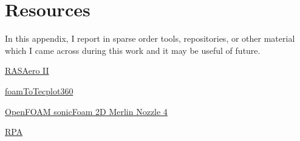 \documentclass[12pt]{article}
\begin{document}
\newpage

\section*{Resources}
In this appendix, I report in sparse order tools, repositories, or other material which I came across during this work and it may be useful of future.

\vspace{0.5cm}

\noindent \href{https://www.rasaero.com/}{RASAero II}

\noindent \href{https://github.com/wyldckat/localFoamToTecplot360}{foamToTecplot360}

\noindent \href{https://github.com/Interfluo/OpenFOAM-sonicFoam-2D-Merlin-Nozzle-4}{OpenFOAM sonicFoam 2D Merlin Nozzle 4}

\noindent \href{https://www.rocket-propulsion.com}{RPA}
\end{document}

